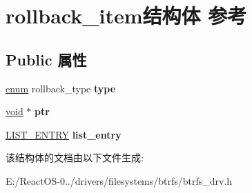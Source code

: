 \hypertarget{structrollback__item}{}\section{rollback\+\_\+item结构体 参考}
\label{structrollback__item}
\subsection*{Public 属性}
\begin{DoxyCompactItemize}
\item 
\mbox{\label{structrollback__item_ab08b4031b64f9b720a857524a99bab46}} 
\hyperlink{interfaceenum}{enum} rollback\+\_\+type {\bfseries type}
\item 
\mbox{\label{structrollback__item_a387d2ad8539b907e540a9d21879dda63}} 
\hyperlink{interfacevoid}{void} $\ast$ {\bfseries ptr}
\item 
\mbox{\label{structrollback__item_a4d4fe1ad6f26509f320beb7af11faed3}} 
\hyperlink{struct___l_i_s_t___e_n_t_r_y}{L\+I\+S\+T\+\_\+\+E\+N\+T\+RY} {\bfseries list\+\_\+entry}
\end{DoxyCompactItemize}


该结构体的文档由以下文件生成\+:\begin{DoxyCompactItemize}
\item 
E\+:/\+React\+O\+S-\/0../drivers/filesystems/btrfs/btrfs\+\_\+drv.\+h\end{DoxyCompactItemize}

